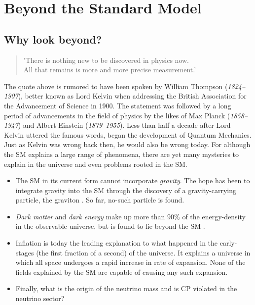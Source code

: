 \newpage
\section{Beyond the Standard Model}
\subsection{Why look beyond?}
\begin{center}
    \hyphenblockcquote{UKenglish}{Kelvin}{
        'There is nothing new to be discovered in physics now.\\
        All that remains is more and more precise measurement.'
        }
\end{center}
The quote above is rumored to have been spoken by William Thompson (\emph{1824–1907}), better
known as Lord Kelvin when addressing the British Association for the Advancement
of Science in 1900. The statement was followed by a long period of advancements in the
field of physics by the likes of Max Planck (\emph{1858–1947}) and 
Albert Einstein (\emph{1879–1955}). Less than half a decade after Lord Kelvin
uttered the famous words, began the development of Quantum Mechanics. 
Just as Kelvin was wrong back then, he would also be wrong today. For although the \ac{SM} explains 
a large range of phenomena, there are yet many mysteries to explain in the universe and even 
problems rooted in the \ac{SM}. 
\begin{itemize}
    \item The \ac{SM} in its current form cannot incorporate \emph{gravity}. 
    The hope has been to integrate gravity into the \ac{SM} through the discovery of a gravity-carrying particle, 
    the graviton \cite{Graviton}. So far, no-such particle is found.
    \item \emph{Dark matter} and \emph{dark energy} make up more than $90\%$ of the energy-density in the 
    observable universe, but is found to lie beyond the \ac{SM} \cite{DarkME}.
    \item Inflation is today the leading explanation to what happened in the early-stages
    (the first fraction of a second) of the universe. It explains a universe in which all space
    undergoes a rapid increase in rate of expansion. None of the fields explained by the \ac{SM} are 
    capable of causing any such expansion.
    \item Finally, what is the origin of the neutrino 
    mass and is \ac{CP} violated in the neutrino sector? 
\end{itemize}
